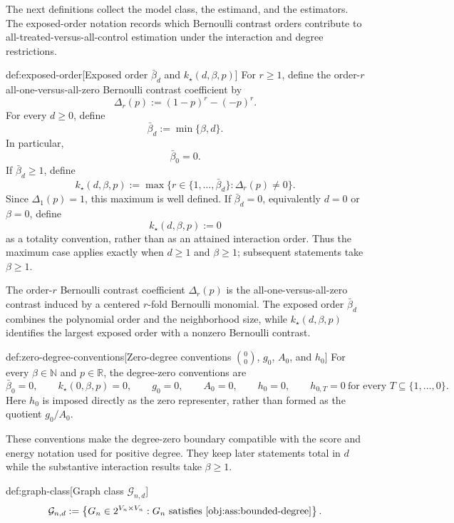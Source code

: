 The next definitions collect the model class, the estimand, and the estimators. The exposed-order notation records which Bernoulli contrast orders contribute to all-treated-versus-all-control estimation under the interaction and degree restrictions.

\begin{definitionv}{def:exposed-order}[Exposed order \(\bar\beta_d\) and \(k_\star(d,\beta,p)\)]
For \(r\ge1\), define the order-\(r\) all-one-versus-all-zero Bernoulli contrast coefficient by
\[
\Delta_r(p):=(1-p)^r-(-p)^r .
\]
For every \(d\ge0\), define
\[
\bar\beta_d:=\min\{\beta,d\}.
\]
In particular,
\[
\bar\beta_0=0 .
\]
If \(\bar\beta_d\ge1\), define
\[
k_\star(d,\beta,p)
:=
\max\bigl\{r\in\{1,\ldots,\bar\beta_d\}:\Delta_r(p)\ne0\bigr\}.
\]
Since \(\Delta_1(p)=1\), this maximum is well defined. If \(\bar\beta_d=0\), equivalently \(d=0\) or \(\beta=0\), define
\[
k_\star(d,\beta,p):=0
\]
as a totality convention, rather than as an attained interaction order. Thus the maximum case applies exactly when \(d\ge1\) and \(\beta\ge1\); subsequent statements take \(\beta\ge1\).
\end{definitionv}

The order-\(r\) Bernoulli contrast coefficient \(\Delta_r(p)\) is the all-one-versus-all-zero contrast induced by a centered \(r\)-fold Bernoulli monomial. The exposed order \(\bar\beta_d\) combines the polynomial order and the neighborhood size, while \(k_\star(d,\beta,p)\) identifies the largest exposed order with a nonzero Bernoulli contrast.

\begin{definitionv}{def:zero-degree-conventions}[Zero-degree conventions \(\binom{0}{0}\), \(g_0\), \(A_0\), and \(h_0\)]
For every \(\beta\in\mathbb N\) and \(p\in\mathbb R\), the degree-zero conventions are
\[
\bar\beta_0=0,
\qquad
k_\star(0,\beta,p)=0,
\qquad
g_0=0,
\qquad
A_0=0,
\qquad
h_0=0,
\qquad
h_{0,T}=0\ \text{for every }T\subseteq\{1,\ldots,0\}.
\]
Here \(h_0\) is imposed directly as the zero representer, rather than formed as the quotient \(g_0/A_0\).
\end{definitionv}

These conventions make the degree-zero boundary compatible with the score and energy notation used for positive degree. They keep later statements total in \(d\) while the substantive interaction results take \(\beta\ge1\).

\begin{definitionv}{def:graph-class}[Graph class $\mathcal G_{n,d}$]
\[
\mathcal G_{n,d}
:=
\left\{
G_n\in 2^{V_n\times V_n}:
G_n \text{ satisfies } \cref{obj:ass:bounded-degree}
\right\}.
\]
\end{definitionv}

